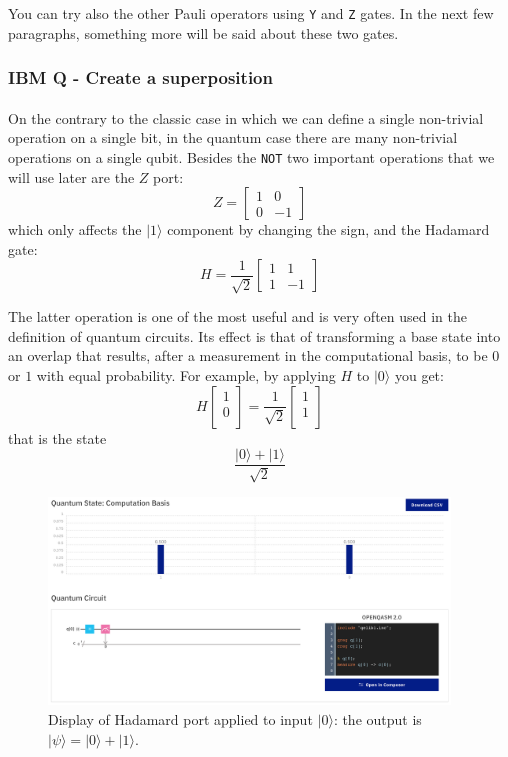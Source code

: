 \documentclass[a4paper,10pt]{article}
\begin{document}
You can try also the other Pauli operators using \texttt{Y} and \texttt{Z} gates. In the next few paragraphs, something more will be said about these two gates.

\subsubsection{IBM Q - Create a superposition}

\paragraph{} On the contrary to the classic case in which we can define a single non-trivial operation on a single bit, in the quantum case there are many non-trivial operations on a single qubit. Besides the \texttt{NOT} two important operations that we will use later are the $Z$ port:
$$Z = \begin{bmatrix}
1 & 0 \\
0 & -1
\end{bmatrix}$$
which only affects the $|1\rangle$ component by changing the sign, and the Hadamard gate:
$$H =\frac{1}{\sqrt{2}}\begin{bmatrix}
1 & 1 \\
1 & -1
\end{bmatrix}$$

The latter operation is one of the most useful and is very often used in the definition of quantum circuits. Its effect is that of transforming a base state into an overlap that results, after a measurement in the computational basis, to be $0$ or $1$ with equal probability. For example, by applying $H$ to $|0\rangle$ you get:
$$H \begin{bmatrix}
1 \\
0 \\
\end{bmatrix} = \frac{1}{\sqrt{2}}
\begin{bmatrix}
1 \\
1 \\
\end{bmatrix}$$
that is the state
$$\frac{|0\rangle + |1\rangle}{\sqrt{2}}$$

\begin{figure}[!htb]
\begin{center}
\includegraphics[width=4.2in]{images/ibmQuantumSphereHadamard.png}
\caption{Display of Hadamard port applied to input $|0\rangle$: the output is $|\psi\rangle = |0\rangle + |1\rangle$.}
\label{ibmQuantumSphereHadamard}
\end{center}
\end{figure}
\end{document}
